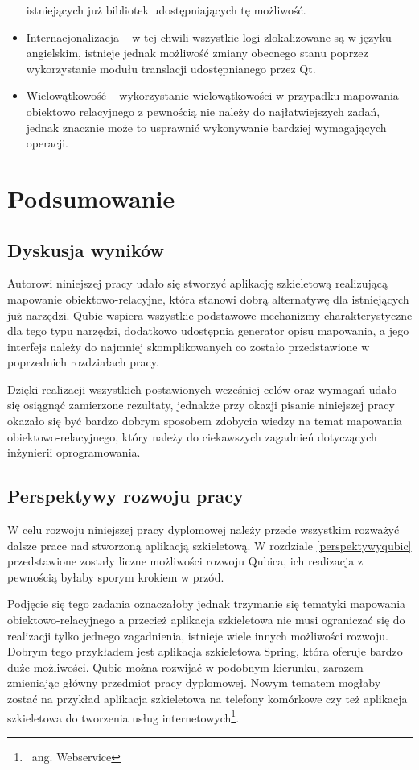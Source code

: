 \documentclass[12pt]{report}
\begin{document}
\begin{itemize}
istniejących już bibliotek udostępniających tę możliwość.
\item Internacjonalizacja -- w tej chwili wszystkie logi zlokalizowane są w języku angielskim, istnieje jednak możliwość zmiany obecnego stanu poprzez wykorzystanie modułu
translacji udostępnianego przez Qt.
\item Wielowątkowość -- wykorzystanie wielowątkowości w przypadku mapowania-obiektowo relacyjnego z pewnością nie należy do najłatwiejszych zadań, jednak znacznie
może to usprawnić wykonywanie bardziej wymagających operacji.
\end{itemize}

\chapter{Podsumowanie} \label{podsumowanie}

\section{Dyskusja wyników}

Autorowi niniejszej pracy udało się stworzyć aplikację szkieletową realizującą ma\-powanie obiektowo-relacyjne, która stanowi dobrą alternatywę dla istniejących już narzędzi.
Qubic wspiera wszystkie podstawowe mechanizmy charakterystyczne dla tego typu narzędzi, dodatkowo udostępnia generator opisu mapowania, a jego interfejs należy do
najmniej skomplikowanych co zostało przedstawione w poprzednich rozdziałach pracy.

Dzięki realizacji wszystkich postawionych wcześniej celów oraz wymagań udało się osiągnąć zamierzone rezultaty, jednakże przy okazji pisanie niniejszej pracy okazało się
być bardzo dobrym sposobem zdobycia wiedzy na temat mapowania obiektowo-relacyjnego, który należy do ciekawszych zagadnień dotyczących inżynierii oprogramowania.

\section{Perspektywy rozwoju pracy}

W celu rozwoju niniejszej pracy dyplomowej należy przede wszystkim rozważyć dalsze prace nad stworzoną aplikacją szkieletową. W rozdziale \ref{perspektywyqubic} przedstawione
zostały liczne możliwości rozwoju Qubica, ich realizacja z pewnością byłaby sporym krokiem w przód.

Podjęcie się tego zadania oznaczałoby jednak trzymanie się tematyki mapowania obiektowo-relacyjnego a przecież aplikacja szkieletowa nie musi ograniczać się do realizacji
tylko jednego zagadnienia, istnieje wiele innych możliwości rozwoju. Dobrym tego przykładem jest aplikacja szkieletowa Spring, która oferuje bardzo duże możliwości. Qubic 
można rozwijać w podobnym kierunku, zarazem zmieniając główny przedmiot pracy dyplomowej. Nowym tematem mogłaby zostać na przykład aplikacja szkieletowa na telefony
komórkowe czy też aplikacja szkieletowa do tworzenia usług internetowych\footnote{~ang. Webservice}.
\end{document}
